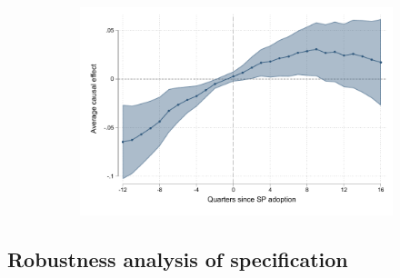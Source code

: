 \begin{figure}[H]
\begin{center}
\begin{subfigure}{0.325\textwidth}
        \includegraphics[width=\textwidth]{Figuras/did_event_bc_e_t.pdf}
    \end{subfigure}
  
  \end{center}
    \scriptsize 

\end{figure}


\subsection{Robustness analysis of \cite{Campos} specification}


